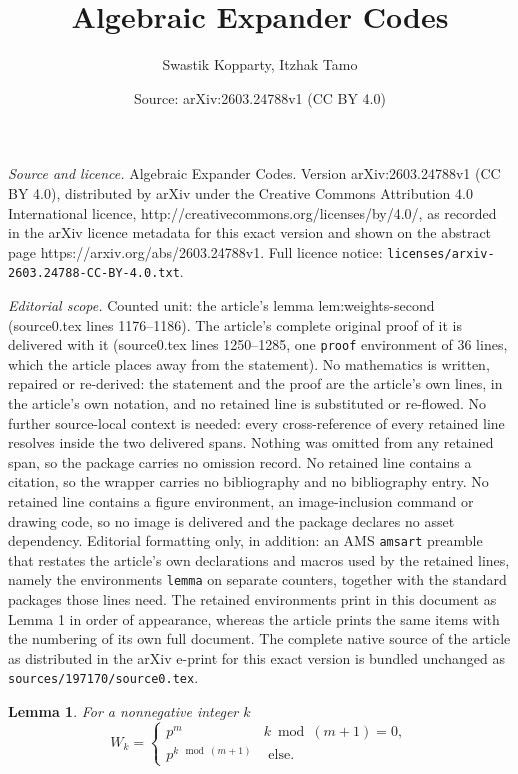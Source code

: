 \documentclass[10pt,a4paper]{amsart}
\title{Algebraic Expander Codes}
\author{Swastik Kopparty, Itzhak Tamo}
\date{Source: arXiv:2603.24788v1 (CC BY 4.0)}
\newtheorem{lemma}{Lemma}
\begin{document}
\maketitle

\noindent\emph{Source and licence.} Algebraic Expander Codes. Version arXiv:2603.24788v1 (CC BY 4.0), distributed by arXiv under the Creative Commons Attribution 4.0 International licence, http://creativecommons.org/licenses/by/4.0/, as recorded in the arXiv licence metadata for this exact version and shown on the abstract page https://arxiv.org/abs/2603.24788v1. Full licence notice: \texttt{licenses/arxiv-2603.24788-CC-BY-4.0.txt}.\par\smallskip

\noindent\textit{Editorial scope.} Counted unit: the article's lemma lem:weights-second (source0.tex lines 1176--1186). The article's complete original proof of it is delivered with it (source0.tex lines 1250--1285, one \texttt{proof} environment of 36 lines, which the article places away from the statement). No mathematics is written, repaired or re-derived: the statement and the proof are the article's own lines, in the article's own notation, and no retained line is substituted or re-flowed.  No further source-local context is needed: every cross-reference of every retained line resolves inside the two delivered spans.  Nothing was omitted from any retained span, so the package carries no omission record.  No retained line contains a citation, so the wrapper carries no bibliography and no bibliography entry.  No retained line contains a figure environment, an image-inclusion command or drawing code, so no image is delivered and the package declares no asset dependency.  Editorial formatting only, in addition: an AMS \texttt{amsart} preamble that restates the article's own declarations and macros used by the retained lines, namely the environments \texttt{lemma} on separate counters, together with the standard packages those lines need.  The retained environments print in this document as Lemma 1 in order of appearance, whereas the article prints the same items with the numbering of its own full document.  The complete native source of the article as distributed in the arXiv e-print for this exact version is bundled unchanged as \texttt{sources/197170/source0.tex}.
\begin{lemma}
\label{lem:weights-second}
For a nonnegative integer  $k$ 
\[
W_k=
\begin{cases}
p^m & k \bmod (m+1) = 0,\\
p^{k\mod(m+1)} & \text{ else}.
\end{cases}
\]
\end{lemma}
\end{document}
